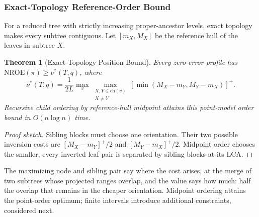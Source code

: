 \documentclass{vgtc}                %
\newtheorem{theorem}{Theorem}
\newcommand{\nroe}{\mathrm{NROE}}
\begin{document}
\subsubsection{Exact-Topology Reference-Order Bound}
For a reduced tree with strictly increasing proper-ancestor levels, exact topology makes every subtree contiguous. Let $[m_X,M_X]$ be the reference hull of the leaves in subtree $X$.
\begin{theorem}[Exact-Topology Position Bound]\label{thm:order}
Every zero-error profile has $\nroe(\pi)\ge\nu^*(T,q)$, where
\begin{equation}\label{eq:nu}
 \nu^*(T,q)=\frac{1}{2L}\max_v\max_{\substack{X,Y\in\mathrm{ch}(v)\\X\ne Y}}
 [\min(M_X-m_Y,M_Y-m_X)]^+.
\end{equation}
Recursive child ordering by reference-hull midpoint attains this point-model order bound in $O(n\log n)$ time.
\end{theorem}
\begin{proof}[Proof sketch]
Sibling blocks must choose one orientation. Their two possible inversion costs are $[M_X-m_Y]^+/2$ and $[M_Y-m_X]^+/2$. Midpoint order chooses the smaller; every inverted leaf pair is separated by sibling blocks at its LCA.
\end{proof}
The maximizing node and sibling pair say where the cost arises, at the merge of two subtrees whose projected ranges overlap, and the value says how much: half the overlap that remains in the cheaper orientation. Midpoint ordering attains the point-order optimum; finite intervals introduce additional constraints, considered next.
\end{document}

